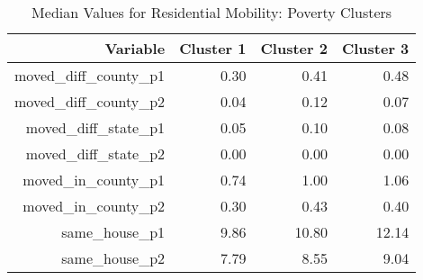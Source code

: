 \begin{table}[ht]
    \centering
    \caption{Median Values for Residential Mobility: Poverty Clusters}
    \label{tab:trans_pov}
    \begin{tabular}{|r|r|r|r|}
      \hline
     Variable & Cluster 1 & Cluster 2 & Cluster 3 \\ 
      \hline
    moved\_diff\_county\_p1 & 0.30 & 0.41 & 0.48 \\
    \hline 
      moved\_diff\_county\_p2 & 0.04 & 0.12 & 0.07 \\ 
      \hline
      moved\_diff\_state\_p1 & 0.05 & 0.10 & 0.08 \\ 
      \hline
      moved\_diff\_state\_p2 & 0.00 & 0.00 & 0.00 \\ 
      \hline
      moved\_in\_county\_p1 & 0.74 & 1.00 & 1.06 \\ 
      \hline
      moved\_in\_county\_p2 & 0.30 & 0.43 & 0.40 \\ 
      \hline
      same\_house\_p1 & 9.86 & 10.80 & 12.14 \\ 
      \hline
      same\_house\_p2 & 7.79 & 8.55 & 9.04 \\ 
       \hline
    \end{tabular}
    \end{table}